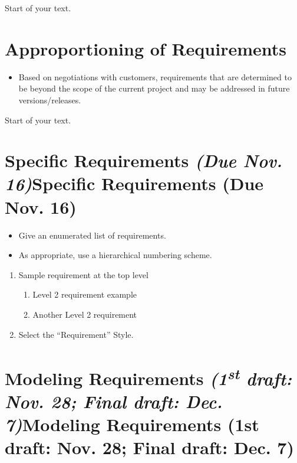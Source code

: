 \documentclass[12pt]{article}
\begin{document}
Start of your text.

\section{Approportioning of
Requirements}\label{approportioning-of-requirements}

\begin{itemize}
\item
  Based on negotiations with customers, requirements that are determined
  to be beyond the scope of the current project and may be addressed in
  future versions/releases.
\end{itemize}

Start of your text.

\section{{Specific Requirements \emph{(Due Nov.
16)}}{Specific Requirements (Due Nov. 16)}}\label{specific-requirements-due-nov.-16}

\begin{itemize}
\item
  Give an enumerated list of requirements.
\item
  As appropriate, use a hierarchical numbering scheme.
\end{itemize}

\begin{enumerate}
\def\labelenumi{\arabic{enumi}.}
\item
  Sample requirement at the top level

  \begin{enumerate}
  \def\labelenumii{\arabic{enumii}.}
  \item
    Level 2 requirement example
  \item
    Another Level 2 requirement
  \end{enumerate}
\item
  Select the ``Requirement'' Style.
\end{enumerate}

\section{{Modeling Requirements
\emph{(1\textsuperscript{st} draft: Nov. 28; Final draft: Dec.
7)}}{Modeling Requirements (1st draft: Nov. 28; Final draft: Dec. 7)}}\label{modeling-requirements-1st-draft-nov.-28-final-draft-dec.-7}
\end{document}
